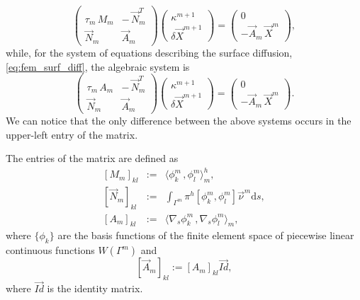 \documentclass[a4paper,11pt, onecolumn]{article}
\begin{document}
\begin{equation}\label{eq:algebraic_mean_curvature}
 \begin{pmatrix}
  \tau_m \, M_m & - \, \vec{N}_{m}^{T} \\
  \vec{N}_m & \vec{A}_m
 \end{pmatrix}
 \begin{pmatrix}
  \kappa^{m + 1} \\
  \delta \vec{X}^{m + 1}
 \end{pmatrix}
 =
 \begin{pmatrix}
  0 \\
  - \vec{A}_m \, \vec{X}^{m}
 \end{pmatrix} ,
\end{equation}
while, for the system of equations describing the surface diffusion,
\eqref{eq:fem_surf_diff}, the algebraic system is
\begin{equation}\label{eq:algebraic_surf_diff}
 \begin{pmatrix}
  \tau_m \, A_m & - \, \vec{N}_{m}^{T} \\
  \vec{N}_m & \vec{A}_m
 \end{pmatrix}
 \begin{pmatrix}
  \kappa^{m + 1} \\
  \delta \vec{X}^{m + 1}
 \end{pmatrix}
 =
 \begin{pmatrix}
  0 \\
  - \vec{A}_m \, \vec{X}^{m}
 \end{pmatrix}.
\end{equation}
We can notice that the only difference between the above systems occurs in the
upper-left entry of the matrix.
\newline

The entries of the matrix are defined as
\begin{eqnarray}\label{eq:algebraic_entries}
 \left[ M_m \right]_{kl} & := & \langle \phi_k^m \, , \phi_l^m \rangle_m^h, \\
 \left[ \vec{N}_m \right]_{kl} & := & \int_{\Gamma^m} \pi^h \left[ \phi_k^m ,
 \phi_l^m \right] \vec{\nu}^m \mathrm{d}s, \\
 \left[ A_m \right]_{kl} & := & \langle \nabla_s \phi_k^m \, , \nabla_s
 \phi_l^m \rangle_m,
\end{eqnarray}
where $\{\phi_k\}$ are the basis functions of the finite element space of
piecewise linear continuous functions $W(\Gamma^m)$ and
\begin{equation}\label{eq:algebraic_entries_vector}
 [\vec{A}_m]_{kl} := [A_m]_{kl} \vec{Id},
\end{equation}
where $\vec{Id}$ is the identity matrix.
\newline
\end{document}
